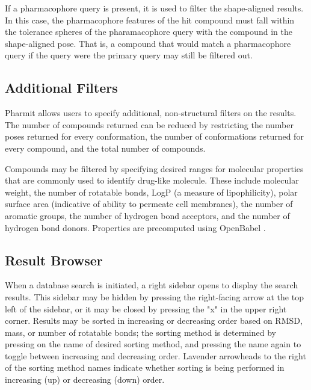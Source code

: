 If a pharmacophore query is present, it is used to filter the shape-aligned results. In this case, the pharmacophore features of the hit compound must fall within the tolerance spheres of the pharamacophore query with the compound in the shape-aligned pose. That is, a compound that would match a pharmacophore query if the query were the primary query may still be filtered out.
 
\subsection{Additional Filters}
Pharmit allows users to specify additional, non-structural filters on the results. The number of compounds returned can be reduced by restricting the number poses returned for every conformation, the number of conformations returned for every compound, and the total number of compounds.

Compounds may be filtered by specifying desired ranges for molecular properties that are commonly used to identify drug-like molecule.
These include molecular weight, the number of rotatable bonds, LogP (a measure of lipophilicity), polar surface area (indicative of ability to permeate cell membranes), the number of aromatic groups, the number of hydrogen bond acceptors, and the number of hydrogen bond donors.  Properties are precomputed using OpenBabel \cite{O_Boyle_2011}.

\subsection{Result Browser}
When a database search is initiated, a right sidebar opens to display the search results. This sidebar may be hidden by pressing the right-facing arrow at the top left of the sidebar, or it may be closed by pressing the "x" in the upper right corner. Results may be sorted in increasing or decreasing order based on RMSD, mass, or number of rotatable bonds; the sorting method is determined by pressing on the name of desired sorting method, and pressing the name again to toggle between increasing and decreasing order. Lavender arrowheads to the right of the sorting method names indicate whether sorting is being performed in increasing (up) or decreasing (down) order. 